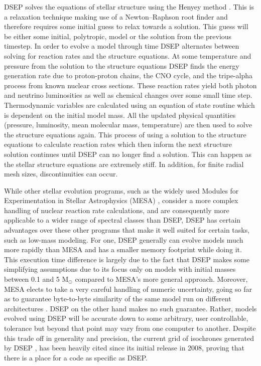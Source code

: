 DSEP solves the equations of stellar structure using the Henyey method
\citep{Henyey1964}. This is a relaxation technique making use of a
Newton–Raphson root finder and therefore requires some initial guess to relax
towards a solution. This guess will be either some initial, polytropic, model
or the solution from the previous timestep.  In order to evolve a model through
time DSEP alternates between solving for reaction rates and the structure
equations. At some temperature and pressure from the solution to the structure
equations DSEP finds the energy generation rate due to proton-proton chains,
the CNO cycle, and the tripe-alpha process from known nuclear cross sections.
These reaction rates yield both photon and neutrino luminosities as well as
chemical changes over some small time step. Thermodynamic variables are
calculated using an equation of state routine which is dependent on the initial
model mass. All the updated physical quantities (pressure, luminosity, mean
molecular mass, temperature) are then used to solve the structure equations
again. This process of using a solution to the structure equations to calculate
reaction rates which then inform the next structure solution continues until
DSEP can no longer find a solution.  This can happen as the stellar structure
equations are extremely stiff. In addition, for finite radial mesh sizes,
discontinuities can occur.

While other stellar evolution programs, such as the widely used Modules for
Experimentation in Stellar Astrophysics (MESA) \citep{Paxton2011}, consider a
more complex handling of nuclear reaction rate calculations, and are
consequently more applicable to a wider range of spectral classes than DSEP,
DSEP has certain advantages over these other programs that make it well suited
for certain tasks, such as low-mass modeling. For one, DSEP generally can
evolve models much more rapidly than MESA and has a smaller memory footprint
while doing it. This execution time difference is largely due to the fact that
DSEP makes some simplifying assumptions due to its focus only on models with
initial masses between 0.1 and 5 M$_{\odot}$ compared to MESA’s more general
approach.  Moreover, MESA elects to take a very careful handling of numeric
uncertainty, going so far as to guarantee byte-to-byte similarity of the same
model run on different architectures \citep{Paxton2011}. DSEP on the other hand
makes no such guarantee. Rather, models evolved using DSEP will be accurate
down to some arbitrary, user controllable, tolerance but beyond that point may
vary from one computer to another. Despite this trade off in generality and
precision, the current grid of isochrones generated by DSEP \citep{Dotter2008},
has been heavily cited since its initial release in 2008, proving that there is
a place for a code as specific as DSEP.


